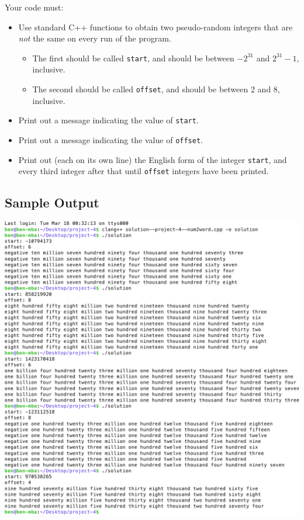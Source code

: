 \documentclass[12pt,letterpaper]{article}
\begin{document}
Your code must:
\begin{itemize}
  \item Use standard C++ functions to obtain two pseudo-random integers that
    are \textit{not} the same on every run of the program.
    \begin{itemize}
      \item The first should be called \lstinline{start}, and should be between
        $-2^{31}$ and $2^{31}-1$, inclusive.
      \item The second should be called \lstinline{offset}, and should be
        between 2 and 8, inclusive.
    \end{itemize}
  \item Print out a message indicating the value of \lstinline{start}.
  \item Print out a message indicating the value of \lstinline{offset}.
  \item Print out (each on its own line) the English form of the integer
    \lstinline{start}, and every third integer after that until
    \lstinline{offset} integers have been printed.
\end{itemize}


\filbreak
\subsection*{Sample Output}
\includegraphics[width=\linewidth]{sample-output}
\end{document}
